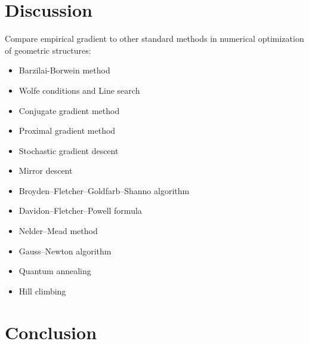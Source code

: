 \documentclass{article}
\begin{document}
    \section{Discussion}
        Compare empirical gradient to other standard methods in numerical optimization of geometric structures:
        \begin{itemize}
            \item Barzilai-Borwein method
            \item Wolfe conditions and Line search
            \item Conjugate gradient method
            \item Proximal gradient method
            \item Stochastic gradient descent
            \item Mirror descent
            \item Broyden–Fletcher–Goldfarb–Shanno algorithm
            \item Davidon–Fletcher–Powell formula
            \item Nelder–Mead method
            \item Gauss–Newton algorithm
            \item Quantum annealing
            \item Hill climbing
        \end{itemize}
\pagebreak
    \section{Conclusion}
\pagebreak
\nocite*{}

\end{document}
